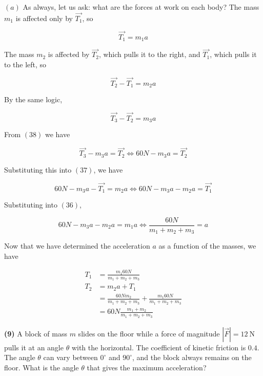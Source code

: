 \documentclass[12pt]{article}
\theoremstyle{definition}
\begin{document}
$(a)$ As always, let us ask: what are the forces at work on each body? The mass
$m_1$ is affected only by $\vec{T_1}$, so

\begin{equation}
    \vec{T_1} = m_1a 
\end{equation}

The mass $m_2$ is affected by $\vec{T_2}$, which pulls it to the right, and
$\vec{T_1}$, which pulls it to the left, so 

\begin{equation}
    \vec{T_2} - \vec{T_1} = m_2 a
\end{equation}

By the same logic, 

\begin{equation}
    \vec{T_3} - \vec{T_2} = m_3 a
\end{equation}

From $(38)$ we have 

\begin{equation}
    \vec{T_3} - m_3a = \vec{T_2} \iff 60N - m_3a = \vec{T_2}
\end{equation}

Substituting this into $(37)$, we have 

\begin{equation}
    60 N - m_3 a - \vec{T_1} =m_2 a \iff 60N - m_3a - m_2 a = \vec{T_1}
\end{equation}

Substituting into $(36)$,

\begin{equation}
    60N - m_3 a - m_2a = m_1 a \iff \frac{ 60N }{m_1 + m_2 + m_3} = a
\end{equation}

Now that we have determined the acceleration $a$ as a function of the masses, 
we have 

\begin{align*}
    T_1 &= \frac{m_1 60N}{m_1 + m_2 + m_3} \\ 
    T_2 &= m_2a + T_1 \\ 
        &= \frac{60Nm_2}{m_1 + m_2 + m_3} + \frac{m_1 60N}{m_1 + m_2
    + m_3} \\ 
        &= 60N \frac{m_1 + m_2}{m_1 + m_2 + m_3}
\end{align*}




\pagebreak 

\begin{shaded}
\textbf{(9)} A block of mass $m$ slides on the floor while a force of magnitude
$|\vec{F}| = 12~\mathrm{N}$ pulls it at an angle $\theta$ with the horizontal.
The coefficient of kinetic friction is $0.4$. The angle $\theta$ can vary
between $0^\circ$ and $90^\circ$, and the block always remains on the floor.
What is the angle $\theta$ that gives the maximum acceleration?
\end{shaded}
\end{document}
